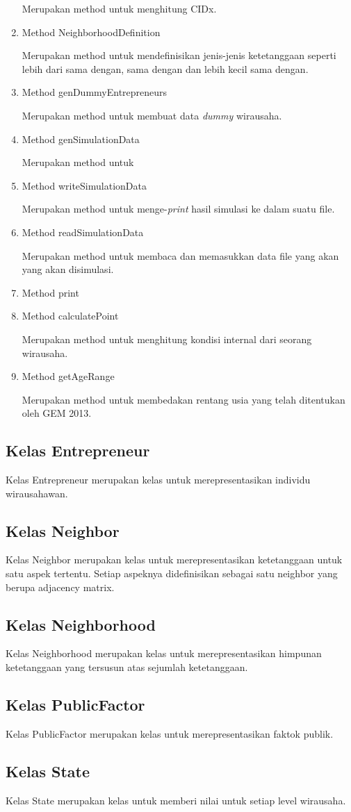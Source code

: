 \begin{enumerate}
			Merupakan method untuk menghitung CIDx.
			
			\item Method NeighborhoodDefinition
			
			Merupakan method untuk mendefinisikan jenis-jenis ketetanggaan seperti lebih dari sama dengan, sama dengan dan lebih kecil sama dengan.
			
			\item Method genDummyEntrepreneurs
			
			Merupakan method untuk membuat data \textit{dummy} wirausaha.
			\item Method genSimulationData
			
			Merupakan method untuk 
			\item Method writeSimulationData
			
			Merupakan method untuk menge-\textit{print} hasil simulasi ke dalam suatu file.
			\item Method readSimulationData
			
			Merupakan method untuk membaca dan memasukkan data file yang akan yang akan disimulasi.
			\item Method print
			\item Method calculatePoint
			
			Merupakan method untuk menghitung kondisi internal dari seorang wirausaha.
			\item Method getAgeRange
			
			Merupakan method untuk membedakan rentang usia yang telah ditentukan oleh GEM 2013.
		\end{enumerate}
\subsection{Kelas Entrepreneur} 
	Kelas Entrepreneur merupakan kelas untuk merepresentasikan individu wirausahawan.
\subsection{Kelas Neighbor}
	Kelas Neighbor merupakan kelas untuk merepresentasikan ketetanggaan untuk satu aspek tertentu. Setiap aspeknya didefinisikan sebagai satu neighbor yang berupa adjacency matrix.
\subsection{Kelas Neighborhood}
	Kelas Neighborhood merupakan kelas untuk merepresentasikan himpunan ketetanggaan yang tersusun atas sejumlah ketetanggaan.
\subsection{Kelas PublicFactor}
	Kelas PublicFactor merupakan kelas untuk merepresentasikan faktok publik.
\subsection{Kelas State}
	Kelas State merupakan kelas untuk memberi nilai untuk setiap level wirausaha.


